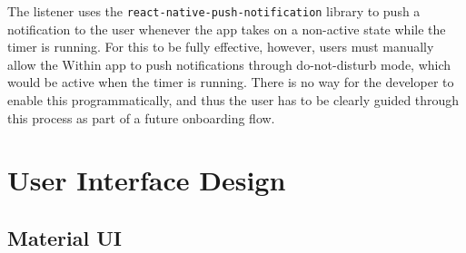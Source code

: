 The listener uses the \texttt{react-native-push-notification} library to push a notification to the user whenever the app takes on a non-active state while the timer is running. For this to be fully effective, however, users must manually allow the Within app to push notifications through do-not-disturb mode, which would be active when the timer is running. There is no way for the developer to enable this programmatically, and thus the user has to be clearly guided through this process as part of a future onboarding flow.

\section{User Interface Design}
\subsection{Material UI}
